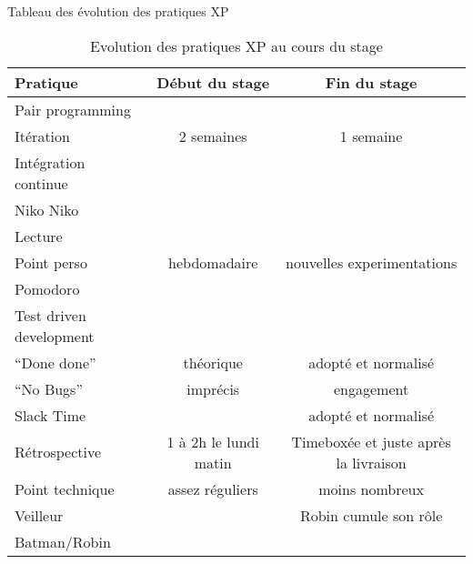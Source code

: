Tableau des évolution des pratiques XP
\begin{table}[h]
	\caption{\label{tableau:evolPratXP}Evolution des pratiques XP au cours du stage}
	\begin{tabular}{|l|c|c|}
		\hline
		Pratique & Début du stage & Fin du stage\\
		\hline
		Pair programming & \tick & \tick \\
		Itération & 2 semaines & 1 semaine \\
		Intégration continue & \tick & \tick \\
		Niko Niko & \tick & \badtick \\
		Lecture & \tick & \badtick \\
		Point perso & hebdomadaire & nouvelles experimentations\\
		Pomodoro & \badtick & \tick \\
		Test driven development & \tick & \tick \\
		``Done done'' & théorique & adopté et normalisé\\
		``No Bugs'' & imprécis & engagement \\
		Slack Time & \badtick & adopté et normalisé\\
		Rétrospective & 1 à 2h le lundi matin & Timeboxée et juste après la livraison\\
		Point technique & assez réguliers & moins nombreux\\
		Veilleur & \tick & Robin cumule son rôle\\
		Batman/Robin & \badtick & \tick \\
		\hline
	\end{tabular}
\end{table}
